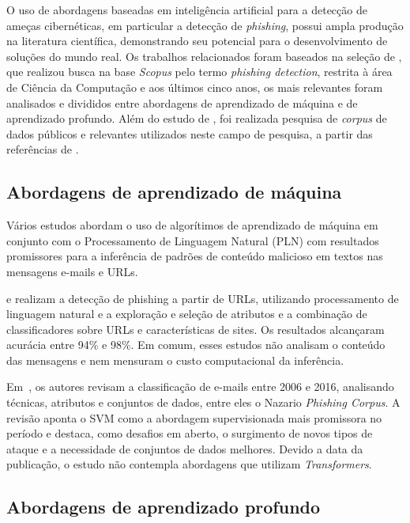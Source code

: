 \documentclass[12pt]{article}
\begin{document}
        O uso de abordagens baseadas em inteligência artificial para a detecção de ameças cibernéticas, em particular a detecção de \textit{phishing}, possui ampla produção na literatura científica, demonstrando seu potencial para o desenvolvimento de soluções do mundo real.  Os trabalhos relacionados foram baseados na seleção de \cite{bispo2025philder},  que realizou busca na base \textit{Scopus} pelo termo \textit{phishing detection}, restrita à área de Ciência da Computação e aos últimos cinco anos, os mais relevantes foram analisados e divididos entre abordagens de aprendizado de máquina e de aprendizado profundo. Além do estudo de \cite{bispo2025philder}, foi realizada pesquisa de \textit{corpus} de dados públicos e relevantes  utilizados neste campo de pesquisa, a partir das referências de \cite{bispo2025philder}.

\subsection{Abordagens de aprendizado de máquina} \label{sub:trab_am}

        Vários estudos abordam o uso de algorítimos de aprendizado de máquina em conjunto com o Processamento de Linguagem Natural (PLN) com resultados promissores para a inferência de padrões de conteúdo malicioso em textos nas mensagens e-mails e URLs.

        \cite{sahingoz2019machine} \cite{chiew2019new} \cite{alsariera2020ai} \cite{almomani2022phishing} e \cite{ubing2019phishing} realizam a detecção de phishing a partir de URLs, utilizando processamento de linguagem natural e a exploração e seleção de atributos e a combinação de classificadores sobre URLs e características de sites. Os resultados alcançaram acurácia entre 94\%  e 98\%. Em comum, esses estudos não analisam o conteúdo das mensagens e nem mensuram o custo computacional da inferência.   

        Em~\cite{mujtaba2017email}, os autores revisam a classificação de e-mails entre 2006 e 2016, analisando técnicas, atributos e conjuntos de dados, entre eles o Nazario \textit{Phishing Corpus}. A revisão aponta o SVM como a
abordagem supervisionada mais promissora no período e destaca, como desafios em aberto, o surgimento de novos tipos de ataque e a necessidade de conjuntos de dados melhores. Devido a data da publicação, o estudo não contempla abordagens que utilizam \textit{Transformers}.

\subsection{Abordagens de aprendizado profundo} \label{sub:trab_ap}
\end{document}
